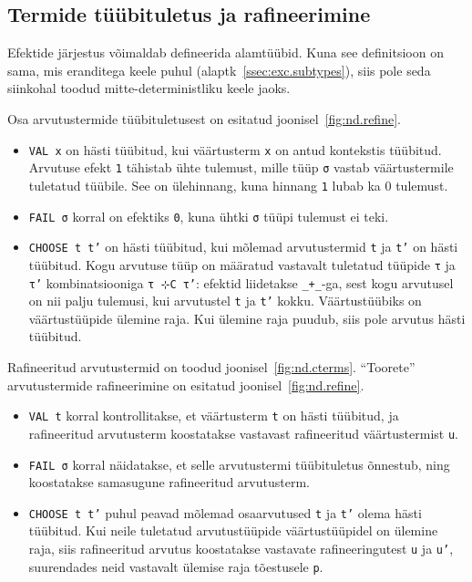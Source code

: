 \documentclass[a4paper,12pt]{article}
\begin{document}
\subsection{Termide tüübituletus ja rafineerimine}

Efektide järjestus võimaldab defineerida alamtüübid.
Kuna see definitsioon on sama, mis eranditega keele puhul (alaptk~\ref{ssec:exc.subtypes}), siis pole seda siinkohal toodud mitte-deterministliku keele jaoks.

Osa arvutustermide tüübituletusest on esitatud joonisel~\ref{fig:nd.refine}.
\begin{itemize}
\item {\tt VAL x} on hästi tüübitud, kui väärtusterm {\tt x} on antud kontekstis tüübitud. Arvutuse efekt {\tt 1} tähistab ühte tulemust, mille tüüp {\tt σ} vastab väärtustermile tuletatud tüübile. See on ülehinnang, kuna hinnang {\tt 1} lubab ka 0 tulemust.
\item {\tt FAIL σ} korral on efektiks {\tt 0}, kuna ühtki {\tt σ} tüüpi tulemust ei teki.
\item {\tt CHOOSE t t'} on hästi tüübitud, kui mõlemad arvutustermid {\tt t} ja {\tt t'} on hästi tüübitud. Kogu arvutuse tüüp on määratud vastavalt tuletatud tüüpide {\tt τ} ja {\tt τ'} kombinatsiooniga {\tt τ ⊹C τ'}: efektid liidetakse {\tt _+_}-ga, sest kogu arvutusel on nii palju tulemusi, kui arvutustel {\tt t} ja {\tt t'} kokku. Väärtustüübiks on väärtustüüpide ülemine raja. Kui ülemine raja puudub, siis pole arvutus hästi tüübitud.
\end{itemize}

Rafineeritud arvutustermid on toodud joonisel~\ref{fig:nd.cterms}.
``Toorete'' arvutustermide rafineerimine on esitatud joonisel~\ref{fig:nd.refine}.
\begin{itemize}
\item {\tt VAL t} korral kontrollitakse, et väärtusterm {\tt t} on hästi tüübitud, ja rafineeritud arvutusterm koostatakse vastavast rafineeritud väärtustermist {\tt u}.
\item {\tt FAIL σ} korral näidatakse, et selle arvutustermi tüübituletus õnnestub, ning koostatakse samasugune rafineeritud arvutusterm.
\item {\tt CHOOSE t t'} puhul peavad mõlemad osaarvutused {\tt t} ja {\tt t'} olema hästi tüübitud. Kui neile tuletatud arvutustüüpide väärtustüüpidel on ülemine raja, siis rafineeritud arvutus koostatakse vastavate rafineeringutest {\tt u} ja {\tt u'}, suurendades neid vastavalt ülemise raja tõestusele {\tt p}.
\end{itemize}
\end{document}
